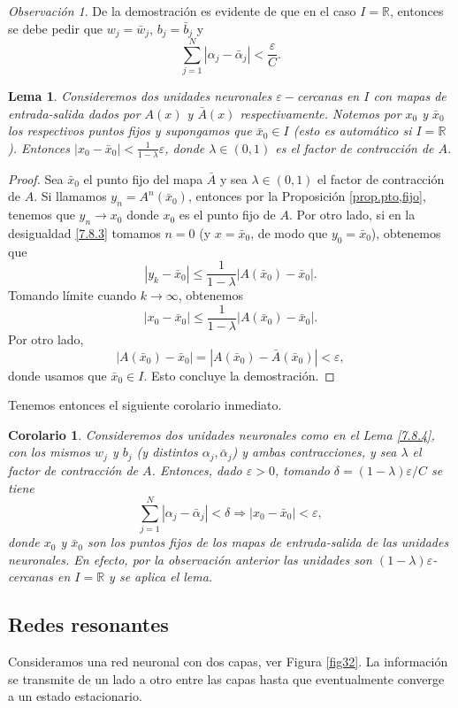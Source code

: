 \documentclass[12pt, a4paper]{amsbook}
\newcommand{\ve}{\varepsilon}
\newcommand{\R}{{\mathbb R}}
\newtheorem{lema}[teo]{Lema}
\newtheorem{cor}[teo]{Corolario}
\theoremstyle{remark}
\newtheorem{obs}[teo]{Observaci\'on}
\theoremstyle{definition}
\numberwithin{section}{chapter}
\numberwithin{subsection}{section}
\numberwithin{equation}{section}
\numberwithin{figure}{chapter}
\begin{document}
\begin{obs}
De la demostración es evidente de que en el caso $I=\R$, entonces se debe pedir que $w_j=\bar w_j$,  $b_j=\bar b_j$ y
$$
\sum_{j=1}^N |\alpha_j - \bar\alpha_j| < \frac{\ve}{C}.
$$
\end{obs}

\begin{lema}
Consideremos dos unidades neuronales $\ve-$cercanas en $I$ con mapas de entrada-salida dados por $A(x)$ y $\bar A(x)$ respectivamente. Notemos por $x_0$ y $\bar x_0$ los respectivos puntos fijos y supongamos que $\bar x_0\in I$ (esto es automático si $I=\R$). Entonces $|x_0-\bar x_0|<\frac{1}{1-\lambda}\ve$, donde $\lambda\in (0,1)$ es el factor de contracción de $A$.
\end{lema}

\begin{proof}
Sea $\bar x_0$ el punto fijo del mapa $\bar A$ y sea $\lambda\in (0,1)$ el factor de contracción de $A$. Si llamamos $y_n = A^n(\bar x_0)$, entonces por la Proposición \ref{prop.pto,fijo}, tenemos que $y_n\to x_0$ donde $x_0$ es el punto fijo de $A$. Por otro lado, si en la desigualdad \eqref{7.8.3} tomamos $n=0$ (y $x=\bar x_0$, de modo que $y_0=\bar x_0$), obtenemos que
$$
|y_k - \bar x_0| \le \frac{1}{1-\lambda} |A(\bar x_0) - \bar x_0|.
$$
Tomando límite cuando $k\to\infty$, obtenemos
$$
|x_0-\bar x_0|\le \frac{1}{1-\lambda} |A(\bar x_0) - \bar x_0|.
$$
Por otro lado,
$$
 |A(\bar x_0) - \bar x_0| =  |A(\bar x_0) - \bar A(\bar x_0)|<\ve,
$$
donde usamos que $\bar x_0\in I$. Esto concluye la demostración.
\end{proof}

Tenemos entonces el siguiente corolario inmediato.
\begin{cor}
Consideremos dos unidades neuronales como en el Lema \ref{7.8.4}, con los mismos $w_j$ y $b_j$ (y distintos $\alpha_j,\bar\alpha_j$) y ambas contracciones, y sea $\lambda$ el factor de contracción de $A$. Entonces, dado $\ve>0$, tomando $\delta=(1-\lambda)\ve/C$ se tiene
$$
\sum_{j=1}^N |\alpha_j - \bar \alpha_j|<\delta \Longrightarrow |x_0-\bar x_0|<\ve,
$$
donde $x_0$ y $\bar x_0$ son los puntos fijos de los mapas de entrada-salida de las unidades neuronales. En efecto, por la observación anterior las unidades son $(1-\lambda)\ve$-cercanas en $I=\R$ y se aplica el lema.
\end{cor}

\subsection{Redes resonantes}
Consideramos una red neuronal con dos capas, ver Figura \ref{fig32}. La información se transmite de un lado a otro entre las capas hasta que eventualmente converge a un estado estacionario.  
\end{document}
